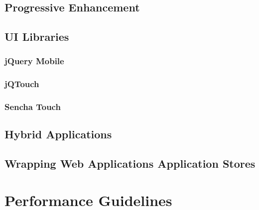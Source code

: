 \subsection{Progressive Enhancement}

\subsection{UI Libraries}
\subsubsection{jQuery Mobile}
\subsubsection{jQTouch}
\subsubsection{Sencha Touch}

\subsection{Hybrid Applications}
\subsection{Wrapping Web Applications Application Stores}

\section{Performance Guidelines}
\label{section:performance-guidelines}

